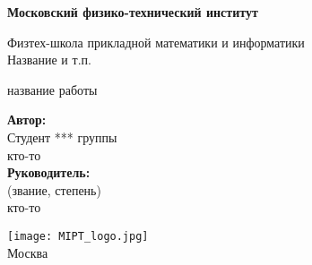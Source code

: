 \begin{center}
    \large\textbf{Московский физико-технический институт} \\
    \vspace{1cm}

    Физтех-школа прикладной математики и информатики \\
    
	Название и т.п.

\end{center}
\vspace{3em}


\begin{center}
    \vspace{\fill}
    \LARGE{название работы}

    \vspace{\fill}
\end{center}


\begin{flushright}
    \textbf{Автор:} \\
    Студент *** группы \\
    кто-то \\
    \vspace{2em}
    \textbf{Руководитель:} \\
    (звание, степень) \\
    кто-то
\end{flushright}

\vspace{7em}


\begin{center}
    \texttt{[image: MIPT\_logo.jpg]}\\
    Москва \the\year{}
\end{center}

\thispagestyle{empty}

\setcounter{page}{2}
\fancyfoot[c]{\thepage}
